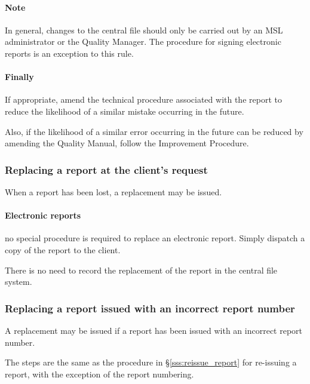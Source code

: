 \begin{enumerate}
\end{enumerate}

\paragraph{Note} In general, changes to the central file should only be carried out by an MSL administrator or the Quality Manager. The procedure for signing electronic reports is an exception to this rule. 

\paragraph{Finally} If appropriate, amend the technical procedure associated with the report to reduce the likelihood of a similar mistake occurring in the future.

Also, if the likelihood of a similar error occurring in the future can be reduced by amending the Quality Manual, follow the Improvement Procedure.

\subsubsection{Replacing a report at the client's request}
When a report has been lost, a replacement may be issued. 

\paragraph{Electronic reports} no special procedure is required to replace an electronic report. Simply dispatch a copy of the report to the client.

There is no need to record the replacement of the report in the central file system.

\subsubsection{Replacing a report issued with an incorrect report number}

A replacement may be issued if a report has been issued with an incorrect report number.

The steps are the same as the procedure in \S\ref{sss:reissue_report} for re-issuing a report, with the exception of the report numbering.

